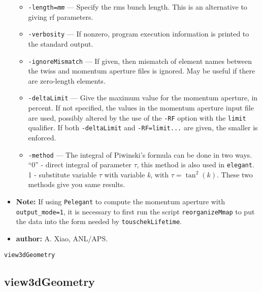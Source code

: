 \documentclass[11pt]{article}
\begin{document}
\begin{itemize}
\begin{itemize}
\item {\tt -length={\em mm}} --- Specify the rms bunch length.  This is an alternative to giving rf parameters.
\item {\tt -verbosity} --- If nonzero, program execution information is printed to the standard output.
\item {\tt -ignoreMismatch} --- If given, then mismatch of element names between the twiss and momentum
  aperture files is ignored.  May be useful if there are zero-length elements.
\item {\tt -deltaLimit} --- Give the maximum value for the momentum aperture, in percent.  If not specified,
  the values in the momentum aperture input file are used, possibly altered by the use of the
  {\tt -RF} option with the {\tt limit} qualifier.  If both {\tt -deltaLimit} and {\tt -RF=limit...} are
  given, the smaller is enforced.
\item {\tt -method} --- The integral of Piwinski's formula can be done
  in two ways. ``0'' - direct integral of parameter {\em $\tau$}, this
  method is also used in {\tt elegant}. 1 - substitute variable {\em
    $\tau$} with variable {\em k}, with $\tau=\tan^2(k)$. These two
  methods give you same results.
\end{itemize}

\item {\bf Note:} If using \verb|Pelegant| to compute the momentum aperture with \verb|output_mode=1|, it is necessary to first run the script
  \verb|reorganizeMmap| to put the data into the form needed by \verb|touschekLifetime|.

\item {\bf author:} A. Xiao, ANL/APS.

\end{itemize}


\newpage
\begin{center}{\Large\verb|view3dGeometry|}\end{center}
\subsection{view3dGeometry}
\end{document}
